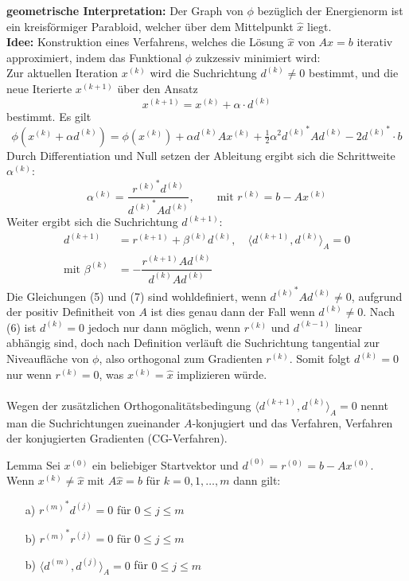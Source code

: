 \documentclass{article}
\begin{document}
\textbf{geometrische Interpretation:} Der Graph von $\phi$ bezüglich der Energienorm ist ein kreisförmiger Parabloid, 
welcher über dem Mittelpunkt $\hat{x}$ liegt. \\
\textbf{Idee:} Konstruktion eines Verfahrens, welches die Lösung $\hat{x}$ von $Ax=b$ iterativ approximiert, 
indem das Funktional $\phi$ zukzessiv minimiert wird: \\
Zur aktuellen Iteration $x^{(k)}$ wird die Suchrichtung $d^{(k)}\neq 0$ bestimmt, und die neue Iterierte 
$x^{(k+1)}$ über den Ansatz 
\[x^{(k+1)} = x^{(k)} + \alpha\cdot d^{(k)} \tag{3}\]
bestimmt. Es gilt
\[\phi(x^{(k)}+\alpha d^{(k)}) = \phi(x^{(k)}) + \alpha d^{(k)}A x^{(k)} + 
\tfrac{1}{2}\alpha^2 {d^{(k)}}^*Ad^{(k)}-2{d^{(k)}}^*\cdot b \tag{4}\]
Durch Differentiation und Null setzen der Ableitung ergibt sich die Schrittweite $\alpha^{(k)}$:
\[\alpha^{(k)}=\dfrac{{r^{(k)}}^* d^{(k)}}{{d^{(k)}}^* A d^{(k)}},\qquad \text{mit } r^{(k)}=b-Ax^{(k)} \tag{5}\]
Weiter ergibt sich die Suchrichtung $d^{(k+1)}$:
\begin{align*}
    d^{(k+1)}&=r^{(k+1)} + \beta^{(k)}d^{(k)},\quad \langle d^{(k+1)}, d^{(k)}\rangle_A = 0\tag{6}\\
    \text{mit } \beta^{(k)} &= -\dfrac{r^{(k+1)}Ad^{(k)}}{d^{(k)}Ad^{(k)}} \tag{7}
\end{align*}
Die Gleichungen (5) und (7) sind wohldefiniert, wenn ${d^{(k)}}^*Ad^{(k)}\neq 0$, aufgrund der positiv Definitheit 
von $A$ ist dies genau dann der Fall wenn $d^{(k)}\neq 0$. 
Nach (6) ist $d^{(k)} = 0$ jedoch nur dann möglich, wenn $r^{(k)}$ und $d^{(k-1)}$ linear abhängig sind, 
doch nach Definition verläuft die Suchrichtung tangential zur Niveaufläche von $\phi$, 
also orthogonal zum Gradienten $r^{(k)}$.
Somit folgt $d^{(k)} = 0$ nur wenn $r^{(k)}=0$, was $x^{(k)}=\hat{x}$ implizieren würde. \\ \\
Wegen der zusätzlichen Orthogonalitätsbedingung $\langle d^{(k+1)},d^{(k)}\rangle_A=0$ nennt man die 
Suchrichtungen zueinander $A$-konjugiert und das Verfahren, Verfahren der konjugierten Gradienten (CG-Verfahren). 
\begin{thmbox}{Lemma}
    Sei $x^{(0)}$ ein beliebiger Startvektor und $d^{(0)}=r^{(0)}=b-Ax^{(0)}$. \\
    Wenn $x^{(k)}\neq \hat{x}$ mit $A\hat{x}=b$ für $k=0,1,\dotsc, m$ dann gilt:
    \begin{enumerate}
        \item[a)] ${r^{(m)}}^*d^{(j)}=0$ für $0\leq j \le m$
        \item[b)] ${r^{(m)}}^*r^{(j)}=0$ für $0\leq j \le m$ 
        \item[b)] $\langle d^{(m)}, d^{(j)}\rangle_A=0$ für $0\leq j \le m$ 
    \end{enumerate}
\end{thmbox}
\end{document}
